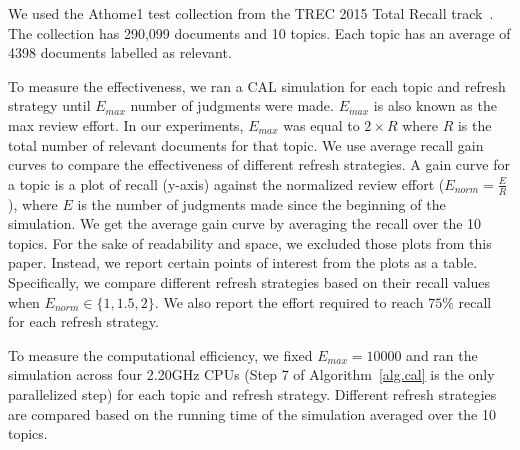 \label{chap:dataset}
We used the Athome1 test collection from the TREC 2015 Total Recall
track~\cite{roegiest2015trec}. The collection has 290,099 documents and 10
topics. Each topic has an average of 4398 documents labelled as relevant.


To measure the effectiveness, we ran a CAL simulation for each topic and refresh
strategy until $E_{max}$ number of judgments were made. $E_{max}$ is also known
as the max review effort. In our experiments, $E_{max}$ was equal to $2\times R$ where
$R$ is the total number of relevant documents for that topic. We use average
recall gain curves to compare the effectiveness of different refresh strategies.
A gain curve for a topic is a plot of recall (y-axis) against the normalized
review effort ($E_{norm} = \frac{E}{R}$), where $E$ is the number of judgments made since
the beginning of the simulation. We get the average gain curve by averaging the
recall over the 10 topics. For the sake of readability and space, we excluded
those plots from this paper. Instead, we report certain points of interest from
the plots as a table. Specifically, we compare different refresh strategies based
on their recall values when $E_{norm} \in \{1,1.5,2\}$. We also report the
effort required to reach $75\%$ recall for each refresh strategy.

To measure the computational efficiency, we fixed $E_{max}=10000$ and ran the
simulation across four 2.20GHz CPUs (Step 7 of Algorithm~\ref{alg.cal} is the
only parallelized step) for each topic and refresh strategy. Different refresh
strategies are compared based on the running time of the simulation averaged
over the 10 topics.
